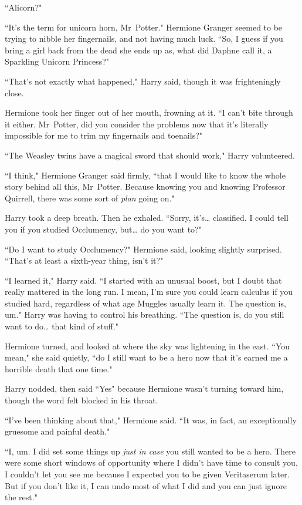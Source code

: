 ``Alicorn?"

``It's the term for unicorn horn, Mr~Potter." Hermione Granger seemed to be trying to nibble her fingernails, and not having much luck. ``So, I guess if you bring a girl back from the dead she ends up as, what did Daphne call it, a Sparkling Unicorn Princess?"

``That's not exactly what happened," Harry said, though it was frighteningly close.

Hermione took her finger out of her mouth, frowning at it. ``I can't bite through it either. Mr~Potter, did you consider the problems now that it's literally impossible for me to trim my fingernails and toenails?"

``The Weasley twins have a magical sword that should work," Harry volunteered.

``I think," Hermione Granger said firmly, ``that I would like to know the whole story behind all this, Mr~Potter. Because knowing you and knowing Professor Quirrell, there was some sort of \emph{plan} going on."

Harry took a deep breath. Then he exhaled. ``Sorry, it's{\ldots} classified. I could tell you if you studied Occlumency, but{\ldots} do you want to?"

``Do I want to study Occlumency?" Hermione said, looking slightly surprised. ``That's at least a sixth-year thing, isn't it?"

``I learned it," Harry said. ``I started with an unusual boost, but I doubt that really mattered in the long run. I mean, I'm sure you could learn calculus if you studied hard, regardless of what age Muggles usually learn it. The question is, um." Harry was having to control his breathing. ``The question is, do you still want to do{\ldots} that kind of stuff."

Hermione turned, and looked at where the sky was lightening in the east. ``You mean," she said quietly, ``do I still want to be a hero now that it's earned me a horrible death that one time."

Harry nodded, then said ``Yes" because Hermione wasn't turning toward him, though the word felt blocked in his throat.

``I've been thinking about that," Hermione said. ``It was, in fact, an exceptionally gruesome and painful death."

``I, um. I did set some things up \emph{just in case} you still wanted to be a hero. There were some short windows of opportunity where I didn't have time to consult you, I couldn't let you see me because I expected you to be given Veritaserum later. But if you don't like it, I can undo most of what I did and you can just ignore the rest."


